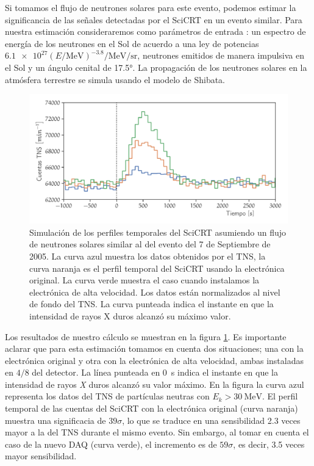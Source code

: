 Si tomamos el flujo de neutrones solares para este evento, podemos estimar la significancia de las señales detectadas por el SciCRT en un evento similar. Para nuestra estimación consideraremos como parámetros de entrada \cite{ynagai14}: un espectro de energía de los neutrones en el Sol de acuerdo a una ley de potencias
$\num{6.1e27}\left(E/\si{\mega\electronvolt}\right)^{-3.8}\si{\per\mega\electronvolt\per\steradian}$, neutrones emitidos de manera impulsiva en el Sol y un ángulo cenital de \ang{17.5}. La propagación de los neutrones solares en la atmósfera terrestre se simula usando el modelo de Shibata.

\begin{figure}
\centering
  \includegraphics[width=\textwidth]{scicrt-sim.pdf}
  \caption{Simulación de los perfiles temporales del SciCRT asumiendo un flujo de neutrones solares similar al del evento del \num{7} de Septiembre de \num{2005}. La curva azul muestra los datos obtenidos por el TNS, la curva naranja es el perfil temporal del SciCRT usando la electrónica original. La curva verde muestra el caso cuando instalamos la electrónica de alta velocidad. Los datos están normalizados al nivel de fondo del TNS. La curva punteada indica el instante en que la intensidad de rayos X duros alcanzó su máximo valor.}
  \label{fig:solar-sim}
\end{figure}

Los resultados de nuestro cálculo se muestran en la figura \ref{fig:solar-sim}. Es importante aclarar que para esta estimación tomamos en cuenta dos situaciones; una con la electrónica original y otra con la electrónica de alta velocidad, ambas instaladas en $4/8$ del detector. La línea punteada en \SI{0}{\second} indica el instante en que la intensidad de rayos \emph{X} duros alcanzó su valor máximo. En la figura la curva azul representa los datos del TNS de partículas neutras con $E_{k}>\SI{30}{\mega\electronvolt}$. El perfil temporal de las cuentas del SciCRT con la electrónica original (curva naranja) muestra una significacia de $39\sigma$, lo que se traduce en una sensibilidad \num{2.3} veces mayor a la del TNS durante el mismo evento. Sin embargo, al tomar en cuenta el caso de la nuevo DAQ (curva verde), el incremento es de $59\sigma$, es decir, \num{3.5} veces mayor sensibilidad.

